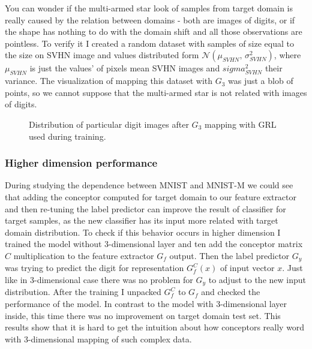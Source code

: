 \documentclass{article}
\begin{document}
\par
You can wonder if the multi-armed star look of samples from target domain is really caused by the relation between domains - both are images of digits, or if the shape has nothing to do with the domain shift and all those observations are pointless. To verify it I created a random dataset with samples of size equal to the size on SVHN image and values distributed form $\mathcal{N}(\mu_{SVHN},\,\sigma_{SVHN}^{2})$, where $\mu_{SVHN}$ is just the values' of pixels mean SVHN images and $sigma_{SVHN}^{2}$ their variance. The visualization of mapping this dataset with $G_{3}$ was just a blob of points, so we cannot suppose that the multi-armed star is not related with images of digits.

\begin{figure}[htb]%
\captionsetup[subfigure]{labelformat=empty}
    \centering
    \qquad
    \caption{Distribution of particular digit images after $G_{3}$ mapping with GRL used during training.}%
    \label{fig:SVHN_GRL}%
\end{figure}

\subsubsection{Higher dimension performance}
\par
During studying the dependence between MNIST and MNIST-M we could see that adding the conceptor computed for target domain to our feature extractor and then re-tuning the label predictor can improve the result of classifier for target samples, as the new classifier has its input more related with target domain distribution. To check if this behavior occurs in higher dimension I trained the model without 3-dimensional layer and ten add the conceptor matrix $C$ multiplication to the feature extractor $G_{f}$ output. Then the label predictor $G_{y}$ was trying to predict the digit for representation $G_{f}^{C}(x)$ of input vector $x$. Just like in 3-dimensional case there was no problem for $G_{y}$ to adjust to the new input distribution. After the training I unpacked $G_{f}^{C}$ to $G_{f}$ and checked the performance of the model. In contrast to the model with 3-dimensional layer inside, this time there was no improvement on target domain test set. This results show that it is hard to get the intuition about how conceptors really word with 3-dimensional mapping of such complex data.
\end{document}
